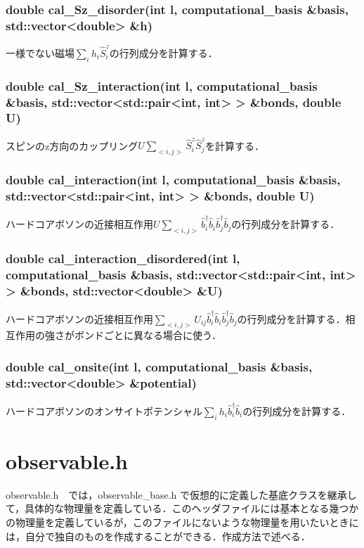 \documentclass[report, 11pt, uplatex]{jsbook}
\newcommand{\ani}[2]{\hat{{#1}}_{#2}}
\newcommand{\cre}[2]{\hat{{#1}}_{#2}^{\dagger}}
\begin{document}
	\subsubsection*{double cal\_Sz\_disorder(int l, computational\_basis \&basis, std::vector<double> \&h)}
	一様でない磁場$\sum_ih_i\hat{S}^{z}_i$の行列成分を計算する．
	
	\subsubsection*{double cal\_Sz\_interaction(int l, computational\_basis \&basis, std::vector<std::pair<int, int> > \&bonds, double U)}
	スピンのz方向のカップリング$U\sum_{<i,j>}\hat{S}^{z}_i\hat{S}^z_j$を計算する．
	
	\subsubsection*{double cal\_interaction(int l, computational\_basis \&basis, std::vector<std::pair<int, int> > \&bonds, double U)}
	ハードコアボソンの近接相互作用$U\sum_{<i,j>}\cre{b}{i}\ani{b}{i}\cre{b}{j}\ani{b}{j}$の行列成分を計算する．
	
	\subsubsection*{double cal\_interaction\_disordered(int l, computational\_basis \&basis, std::vector<std::pair<int, int> > \&bonds, std::vector<double> \&U)}
	ハードコアボソンの近接相互作用$\sum_{<i,j>}U_{ij}\cre{b}{i}\ani{b}{i}\cre{b}{j}\ani{b}{j}$の行列成分を計算する．相互作用の強さがボンドごとに異なる場合に使う．
	
	\subsubsection*{double cal\_onsite(int l, computational\_basis \&basis, std::vector<double> \&potential)}
	ハードコアボソンのオンサイトポテンシャル$\sum_i h_i\cre{b}{i}\ani{b}{i}$の行列成分を計算する．
	
	\section{observable.h}
	observable.h　では，observable\_base.h で仮想的に定義した基底クラスを継承して，具体的な物理量を定義している．このヘッダファイルには基本となる幾つかの物理量を定義しているが，このファイルにないような物理量を用いたいときには，自分で独自のものを作成することができる．作成方法で述べる．
	
\end{document}
